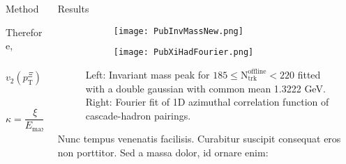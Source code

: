 \documentclass[final]{beamer}
\newlength{\onecolwid}
\newlength{\twocolwid}
\begin{document}
\begin{frame}[t]
\begin{columns}[t]
\begin{column}{\twocolwid}
\begin{columns}[t,totalwidth=\twocolwid]
\begin{column}{\twocolwid}
\begin{block}{Method}
\begin{minipage}[t]{0.5\textwidth}
Therefore,

\begin{equation}
\boxed{
v_{2}(p_{\mathrm{T}}^{\Xi}) =
\frac{V_{2\Delta}(p_{\mathrm{T}}^{\Xi},p_{\mathrm{T}}^{\mathrm{ref}})}{\sqrt{V_{2\Delta}p_{\mathrm{T}}^{\mathrm{ref}},p_{\mathrm{T}}^{\mathrm{ref}}}}
}
\end{equation}



\begin{equation}
\kappa =\frac{\xi}{E_{\mathrm{max}}} %
\end{equation}

\end{minipage}
\end{block}


\end{column} %

\begin{column}{\onecolwid} %


\begin{block}{Results}
\begin{figure}[H]
  \centering
  \begin{subfigure}[t]{0.45\textwidth}
    \texttt{[image: PubInvMassNew.png]}
  \end{subfigure}
  \begin{subfigure}[t]{0.45\textwidth}
    \texttt{[image: PubXiHadFourier.png]}
  \end{subfigure}
  \caption{
  Left: Invariant mass peak for $ 185 \leq
  \mathrm{N}_{\mathrm{trk}}^{\mathrm{offline}} < 220 $ fitted with a double
  gaussian with common mean 1.3222 GeV. Right: Fourier fit of 1D azimuthal
  correlation function of cascade-hadron pairings.
  }
\end{figure}


Nunc tempus venenatis facilisis. Curabitur suscipit consequat eros non porttitor. Sed a massa dolor, id ornare enim:


\end{block}
\end{column}
\end{columns}
\end{column}
\end{columns}
\end{frame}
\end{document}
